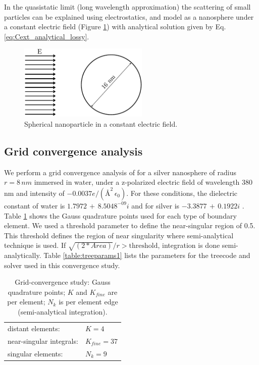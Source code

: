 In the quasistatic limit (long wavelength approximation) the scattering 
of small particles can be explained using electrostatics, and model as
a nanosphere under a constant electric field (Figure \ref{fig:sph_field}) 
with analytical solution given by Eq. \eqref{eq:Cext_analytical_lossy}.

\begin{figure}%
    \centering
    \includegraphics[width=0.55\textwidth]{sphere_field_8nm.pdf} 
    \caption{Spherical nanoparticle in a constant electric field.}
    \label{fig:sph_field}
\end{figure}

\subsection{Grid convergence analysis}\label{sub_sec:grid_conv_iso}

We perform a grid convergence analysis of \pygbe for a silver nanosphere 
of radius $r=8\,nm$ immersed in water, under a z-polarized electric field
of wavelength 380 nm and intensity of $-0.0037 e/(\text{\AA}^2 \, \epsilon_0)$.
For these conditions, the dielectric constant of water is
$1.7972 \, + \, 8.5048^{-09}i$ \cite{HaleQuerry1972} and for silver is
$-3.3877 \, + \, 0.1922i$ \cite{JohnsonChristy1972}. 
Table  \ref{table:quadparams1} shows the Gauss quadrature points used for each 
type of boundary element. We used a threshold parameter to define the near-singular
region of 0.5. This threshold defines the region of near singularity where 
semi-analytical technique is used. If $\sqrt{(2*Area)}/r > \text{threshold}$,
integration is done semi-analytically.
Table \ref{table:treeparams1} lists the parameters for the treecode and solver 
used in this convergence study.

\begin{table}%
    \centering
    \caption{\label{table:quadparams1} Grid-convergence study: Gauss quadrature points; 
    $K$ and $K_{fine}$ are per element; $N_k $ is per element edge (semi-analytical integration). } 
    \begin{tabular}{l l}
    \hline%
     distant elements: & $K=4$ \\
     near-singular integrals:   & $ K_{fine}=37$ \\
     singular elements:  & $N_k =9$ \\
    \hline%
    \end{tabular}
\end{table}



